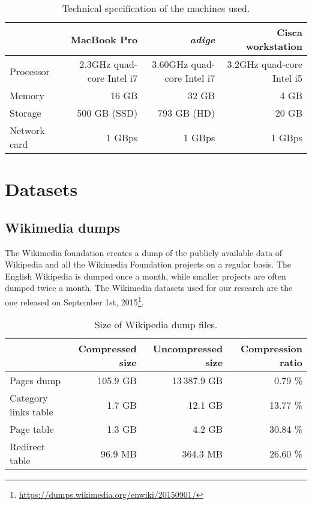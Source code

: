 \begin{table}[t]
\centering
\begin{tabular}{@{}lrrr@{}}
\toprule
\multicolumn{1}{c}{\textbf{}} & \textbf{MacBook Pro}           & \textbf{\emph{adige}}                  & \textbf{Cisca workstation} \\ \midrule
Processor                     & 2.3GHz quad-core Intel i7 & 3.60GHz quad-core Intel i7 &  3.2GHz quad-core Intel i5  \\
Memory                        & 16 GB                          & 32 GB                           &   4 GB                         \\
Storage                       & 500 GB (SSD)                   & 793 GB (HD)                     &  20 GB                          \\
Network card                  & 1 GBps                         & 1 GBps                          &  1 GBps                          \\
\bottomrule
\end{tabular}
\caption{Technical specification of the machines used.}
\label{tbl:tech_specs}
\end{table}


\section{Datasets}
\label{sec:datasets}

\subsection{Wikimedia dumps}
\label{sec:Wikipedia dumps}
The Wikimedia foundation creates a dump of the publicly available data of Wikipedia and all the Wikimedia Foundation projects on a regular basis.
The English Wikipedia is dumped once a month, while smaller projects are often dumped twice a month.
The Wikimedia datasets used for our research are the one released on September 1st, 2015\footnote{\url{https://dumps.wikimedia.org/enwiki/20150901/}}.

\begin{table}[t]
\centering
\begin{tabular}{@{}lrrr@{}}
\toprule
\multicolumn{1}{c}{\textbf{}} & \textbf{Compressed size} & \textbf{Uncompressed size} & \textbf{Compression ratio} \\ \midrule
Pages dump              &     105.9 GB &   13\,387.9 GB &  0.79 \% \\
Category links table    &       1.7 GB &        12.1 GB & 13.77 \% \\
Page table              &       1.3 GB &         4.2 GB & 30.84 \% \\
Redirect table          &      96.9 MB &       364.3 MB & 26.60 \% \\
\bottomrule
\end{tabular}
\caption{Size of Wikipedia dump files.}
\label{tbl:wikidumps_size}
\end{table}

